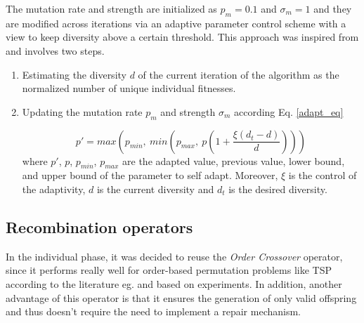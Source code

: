 \documentclass[a4paper,10pt]{article}
\newcommand{\ReplaceMe}[1]{{\color{blue}#1}}
\begin{document}
The mutation rate and strength are initialized as $p_m=0.1$ and $\sigma_m=1$ and they are modified across iterations via an adaptive parameter control scheme with a view to keep diversity above a certain threshold. This approach was inspired from \cite{mut_adapt} and involves two steps.

\begin{enumerate}
\item Estimating the diversity $d$ of the current iteration of the algorithm as the normalized number of unique individual fitnesses.

\item Updating the mutation rate $p_m$ and strength $\sigma_m$ according Eq. \ref{adapt_eq}

\begin{equation} \label{adapt_eq}
p' = max(p_{min},~min(p_{max}, ~p (1 + \frac{\xi (d_t-d)}{d})))
\end{equation}
where $p'$, $p$, $p_{min}$, $p_{max}$ are the adapted value, previous value, lower bound, and upper bound of the parameter to self adapt. Moreover, $\xi$ is the control of the adaptivity, $d$ is the current diversity and $d_t$ is the desired diversity.

\end{enumerate}


\subsection{Recombination operators}


In the individual phase, it was decided to reuse the \textit{Order Crossover} \cite{davis} operator, since it performs really well for order-based permutation problems like TSP according to the literature eg. \cite{memetic} and based on experiments. In addition, another advantage of this operator is that it ensures the generation of only valid offspring and thus doesn't require the need to implement a repair mechanism.
\end{document}

